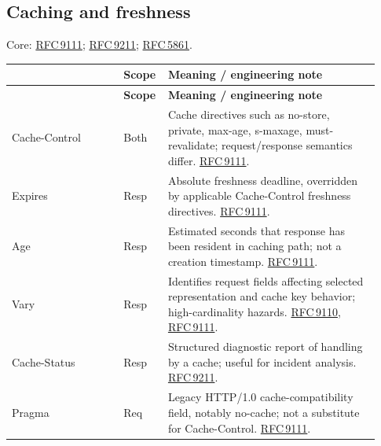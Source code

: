 \documentclass[10pt,letterpaper,oneside]{article}
\newcommand{\rf}[1]{\href{https://www.rfc-editor.org/rfc/rfc#1.html}{RFC\,#1}}
\newcommand{\cataloghead}{\toprule\rowcolor{Navy}\multicolumn{1}{>{\columncolor{Navy}}p{0.291\linewidth}}{\color{white}\sffamily\bfseries Field} & \color{white}\sffamily\bfseries Scope & \color{white}\sffamily\bfseries Meaning / engineering note \\ \midrule}
\newcommand{\catalogstart}{\begingroup\footnotesize\setlength{\LTpre}{0.15em}\setlength{\LTpost}{0.6em}\begin{longtable}{>{\RaggedRight\arraybackslash}p{0.291\linewidth}>{\RaggedRight\arraybackslash}p{0.085\linewidth}>{\RaggedRight\arraybackslash}p{0.555\linewidth}}\cataloghead\endfirsthead\cataloghead\endhead}
\newcommand{\catalogend}{\bottomrule\end{longtable}\endgroup}
\begin{document}
\subsection{Caching and freshness}
\begin{tipbox}\footnotesize Core: \rf{9111}; \rf{9211}; \rf{5861}.\end{tipbox}
\catalogstart
{\ttfamily\color{Deep}Cache-\allowbreak{}Control} & {\sffamily\scriptsize\color{Muted}Both} & Cache directives such as no-store, private, max-age, s-maxage, must-revalidate; request/response semantics differ. \rf{9111}. \\ \midrule
{\ttfamily\color{Deep}Expires} & {\sffamily\scriptsize\color{Muted}Resp} & Absolute freshness deadline, overridden by applicable Cache-Control freshness directives. \rf{9111}. \\ \midrule
{\ttfamily\color{Deep}Age} & {\sffamily\scriptsize\color{Muted}Resp} & Estimated seconds that response has been resident in caching path; not a creation timestamp. \rf{9111}. \\ \midrule
{\ttfamily\color{Deep}Vary} & {\sffamily\scriptsize\color{Muted}Resp} & Identifies request fields affecting selected representation and cache key behavior; high-cardinality hazards. \rf{9110}, \rf{9111}. \\ \midrule
{\ttfamily\color{Deep}Cache-\allowbreak{}Status} & {\sffamily\scriptsize\color{Muted}Resp} & Structured diagnostic report of handling by a cache; useful for incident analysis. \rf{9211}. \\ \midrule
{\ttfamily\color{Deep}Pragma} & {\sffamily\scriptsize\color{Muted}Req} & Legacy HTTP/1.0 cache-compatibility field, notably no-cache; not a substitute for Cache-Control. \rf{9111}. \\ \midrule
\catalogend
\end{document}
